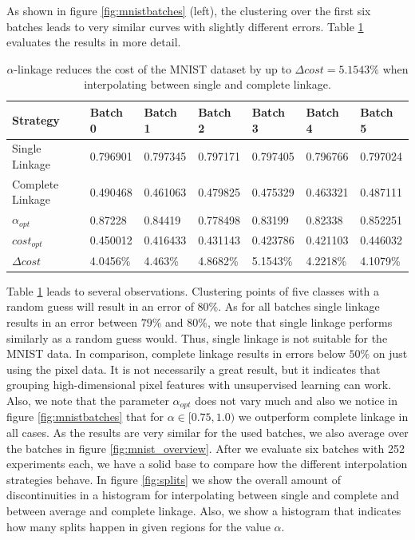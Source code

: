 As shown in figure \ref{fig:mnistbatches} (left), the clustering over the first six batches leads to very similar curves with slightly different errors. Table \ref{table:mnistscbatches} evaluates the results in more detail.

\begin{table}[H]
    \centering
    \begin{tabular}{|l | l l l l l l |}
    \hline
    Strategy & Batch 0 & Batch 1 & Batch 2 & Batch 3 & Batch 4 & Batch 5\\ \hline
    Single Linkage & 0.796901 & 0.797345 & 0.797171 & 0.797405 & 0.796766 & 0.797024\\
    Complete Linkage & 0.490468 & 0.461063 & 0.479825 & 0.475329 & 0.463321 & 0.487111\\
    $\alpha_{opt}$ & 0.87228 & 0.84419 & 0.778498 & 0.83199 & 0.82338 & 0.852251\\
    $cost_{opt}$ & 0.450012 & 0.416433 & 0.431143 & 0.423786 & 0.421103 & 0.446032\\
    $\Delta cost$ & 4.0456\% & 4.463\% & 4.8682\% & 5.1543\% & 4.2218\% & 4.1079\%\\\hline
    \end{tabular}
    \caption{$\alpha$-linkage reduces the cost of the MNIST dataset by up to $\Delta cost = 5.1543\%$ when interpolating between single and complete linkage.}
    \label{table:mnistscbatches}
\end{table}

Table \ref{table:mnistscbatches} leads to several observations. Clustering points of five classes with a random guess will result in an error of $80\%$. As for all batches single linkage results in an error between $79\%$ and $80\%$, we note that single linkage performs similarly as a random guess would. Thus, single linkage is not suitable for the MNIST data. In comparison, complete linkage results in errors below $50\%$ on just using the pixel data. It is not necessarily a great result, but it indicates that grouping high-dimensional pixel features with unsupervised learning can work. Also, we note that the parameter $\alpha_{opt}$ does not vary much and also we notice in figure \ref{fig:mnistbatches} that for $\alpha \in [0.75,1.0)$ we outperform complete linkage in all cases. As the results are very similar for the used batches, we also average over the batches in figure \ref{fig:mnist_overview}. After we evaluate six batches with 252 experiments each, we have a solid base to compare how the different interpolation strategies behave. In figure \ref{fig:splits} we show the overall amount of discontinuities in a histogram for interpolating between single and complete and between average and complete linkage. Also, we show a histogram that indicates how many splits happen in given regions for the value $\alpha$.

